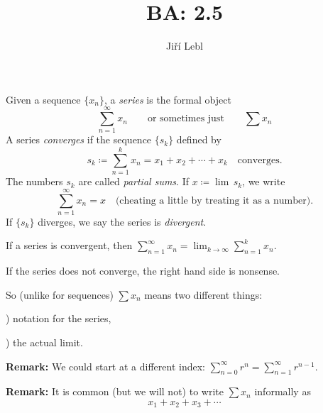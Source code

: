 \documentclass[10pt,aspectratio=149]{beamer}
\author{Ji\v{r}\'i Lebl}
\institute[OSU]{%
Departemento pri Matematiko de Oklahoma {\^S}tata Universitato}
\title{BA: 2.5}
\date{}
\begin{document}
\begin{frame}
\titlepage
\end{frame}

\begin{frame}
\begin{definition}
Given a sequence $\{ x_n \}$, a \emph{series} is the formal object
\begin{equation*}
\sum_{n=1}^\infty x_n
\qquad
\text{or sometimes just}
\qquad
\sum x_n
\end{equation*}
\pause
A series \emph{converges} if the sequence $\{ s_k \}$ defined by
\begin{equation*}
s_k \coloneqq \sum_{n=1}^k x_n = x_1 + x_2 + \cdots + x_k 
\quad \text{converges}.
\end{equation*}
\pause
The numbers $s_k$ are called
\emph{partial sums}.
\pause
If $x \coloneqq \lim\, s_k$, we write
\begin{equation*}
\sum_{n=1}^\infty x_n =  x 
\quad \text{(cheating a little by treating it as a number)}.
\end{equation*}
\pause
If $\{ s_k \}$ diverges,
we say the series is \emph{divergent}.
\end{definition}

\end{frame}

\begin{frame}
If a series is convergent, then
\quad
$\displaystyle
\sum_{n=1}^\infty x_n
=
\lim_{k\to\infty} 
\sum_{n=1}^k x_n$.

\pause
\medskip

If the series does not converge, the right hand side is nonsense.

\pause
So (unlike for sequences) $\sum x_n$ means two different things:

) notation for the series,

) the actual limit.

\pause
\medskip

\textbf{Remark:}
We could start at a different index:
\quad
$\displaystyle
\sum_{n=0}^\infty r^n = \sum_{n=1}^\infty r^{n-1}$.

\pause
\medskip

\textbf{Remark:}
It is common (but we will not) to write $\sum x_n$ informally as
\begin{equation*}
x_1 + x_2 + x_3 + \cdots
\end{equation*}

\end{frame}
\end{document}
